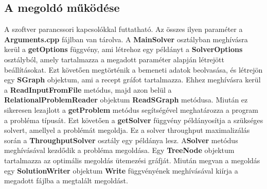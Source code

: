 \subsection{A megoldó működése}
A szoftver parancssori kapcsolókkal futtatható. Az összes ilyen paraméter a \textbf{Arguments.cpp} fájlban van tárolva. A \textbf{MainSolver} osztályban meghívásra kerül a \textbf{getOptions} függvény, ami létrehoz egy példányt a \textbf{SolverOptions} osztályból, amely tartalmazza a megadott paraméter alapján létrejött beállításokat. Ezt követően megtörténik a bemeneti adatok beolvasása, és létrejön egy \textbf{SGraph} objektum, ami a recept gráfot tartalmazza. Ehhez meghívásra kerül a \textbf{ReadInputFromFile} metódus, majd azon belül a \textbf{RelationalProblemReader} objektum \textbf{ReadSGraph} metódusa. Miután ez sikeresen lezajlott a \textbf{getProblem} metódus segítségével meghatározza a program a probléma típusát. Ezt követően a \textbf{getSolver} függvény példányosítja a szükséges solvert, amellyel a problémát megoldja. Ez a solver throughput maximalizálás során a \textbf{ThroughputSolver} osztály egy példánya lesz. A\textbf{Solver} metódus meghívásával kezdődik a probléma megoldása. Egy \textbf{TreeNode} objektum tartalmazza az optimális megoldás ütemezési gráfját. Miután megvan a megoldás egy \textbf{SolutionWriter} objektum \textbf{Write} függvényének meghívásával kiírja a megadott fájlba a megtalált megoldást.

